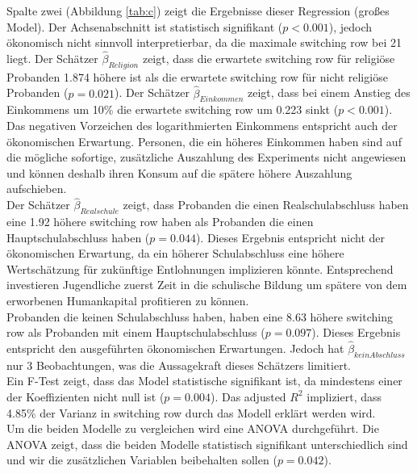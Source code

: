 \documentclass[11pt,a4paper]{article}
\begin{document}
Spalte zwei (Abbildung \ref{tab:c}) zeigt die Ergebnisse dieser Regression (großes Model). Der Achsenabschnitt ist statistisch signifikant ($p < 0.001$), jedoch ökonomisch nicht sinnvoll interpretierbar, da die maximale switching row bei 21 liegt. Der Schätzer $\hat{\beta}_{Religion}$ zeigt, dass die erwartete switching row für religiöse Probanden 1.874 höhere ist als die erwartete switching row für nicht religiöse Probanden ($p = 0.021$). Der Schätzer $\hat{\beta}_{Einkommen}$ zeigt, dass bei einem Anstieg des Einkommens um 10\% die erwartete switching row um 0.223 sinkt ($p < 0.001$). Das negativen Vorzeichen des logarithmierten Einkommens entspricht auch der ökonomischen Erwartung. Personen, die ein höheres Einkommen haben sind auf die mögliche sofortige, zusätzliche Auszahlung des Experiments nicht angewiesen und können deshalb ihren Konsum auf die spätere höhere Auszahlung aufschieben.\\
Der Schätzer $\hat{\beta}_{Realschule}$ zeigt, dass Probanden die einen Realschulabschluss haben eine 1.92 höhere switching row haben als Probanden die einen Hauptschulabschluss haben ($p = 0.044$). Dieses Ergebnis entspricht nicht der ökonomischen Erwartung, da ein höherer Schulabschluss eine höhere Wertschätzung für zukünftige Entlohnungen implizieren könnte. Entsprechend investieren Jugendliche zuerst Zeit in die schulische Bildung um spätere von dem erworbenen Humankapital profitieren zu können.\\
Probanden die keinen Schulabschluss haben, haben eine 8.63 höhere switching row als Probanden mit einem Hauptschulabschluss ($p = 0.097$). Dieses Ergebnis entspricht den ausgeführten ökonomischen Erwartungen. Jedoch hat $\hat{\beta}_{kein Abschluss}$ nur 3 Beobachtungen, was die Aussagekraft dieses Schätzers limitiert.\\ 


Ein F-Test zeigt, dass das Model statistische signifikant ist, da mindestens einer der Koeffizienten nicht null ist ($p = 0.004$). Das adjusted $R^2$ impliziert, dass 4.85\% der Varianz in switching row durch das Modell erklärt werden wird.\\ 

Um die beiden Modelle zu vergleichen wird eine ANOVA durchgeführt. Die ANOVA zeigt, dass die beiden Modelle statistisch signifikant unterschiedlich sind und wir die zusätzlichen Variablen beibehalten sollen ($p = 0.042$).\\ 

\end{document}

